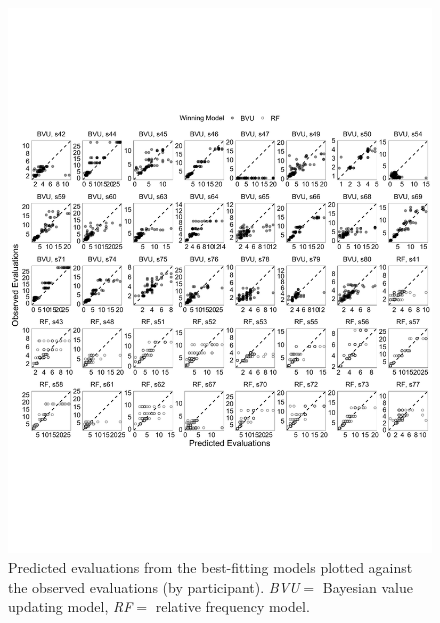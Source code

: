 \documentclass[a4paper, man, floatsintext]{apa6}
\begin{document}
\begin{figure}[htb]

{\centering \includegraphics[width=\textwidth]{../figures/fig5_2-1} 

}

\caption{Predicted evaluations from the best-fitting models plotted against the observed evaluations (by participant). \textit{BVU}$=$ Bayesian value updating model, \textit{RF}$=$ relative frequency model.}\label{fig:fig5_2}
\end{figure}
\end{document}
